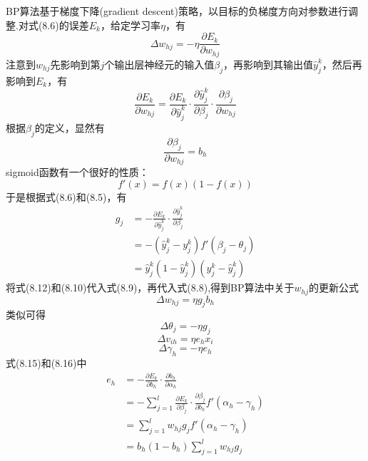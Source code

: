 \documentclass[openany]{progbookcn}
\begin{document}
\indent BP算法基于梯度下降(gradient descent)策略，以目标的负梯度方向对参数进行调整.对式(8.6)的误差$E_k$，给定学习率$\eta$，有
\begin{equation}
\Delta{w_{hj}}= - \eta \frac{{\partial {E_k}}}{{\partial {w_{hj}}}}
\end{equation}
\indent 注意到$w_{hj}$先影响到第$j$个输出层神经元的输入值$\beta_j$，再影响到其输出值${\hat y}_j^k$，然后再影响到$E_k$，有
\begin{equation}
\frac{{\partial {E_k}}}{{\partial {w_{hj}}}} = \frac{{\partial {E_k}}}{{\partial \hat y_j^k}} \cdot \frac{{\partial \hat y_j^k}}{{\partial {\beta _j}}} \cdot \frac{{\partial {\beta _j}}}{{\partial {w_{hj}}}}
\end{equation}
\indent 根据$\beta_j$的定义，显然有
\begin{equation}
\frac{{\partial {\beta _j}}}{{\partial {w_{hj}}}} = {b_h}
\end{equation}
\indent sigmoid函数有一个很好的性质：
\begin{equation}
f'(x)=f(x)(1-f(x))
\end{equation}
\indent 于是根据式(8.6)和(8.5)，有
\begin{equation}
\begin{aligned}
g_j& = - \frac{{\partial {E_k}}}{{\partial \hat y_j^k}} \cdot \frac{{\partial \hat y_j^k}}{{\partial {\beta _j}}}\\
&= - \left( {\hat y_j^k - y_j^k} \right)f'\left( {{\beta _j} - {\theta _j}} \right)\\
&=\hat y_j^k\left( {1 - \hat y_j^k} \right)\left( {y_j^k - \hat y_j^k} \right)
\end{aligned}
\end{equation}
\indent 将式(8.12)和(8.10)代入式(8.9)，再代入式(8.8),得到BP算法中关于$w_{hj}$的更新公式
\begin{equation}
    \Delta w_{hj}={\eta} {g_j} {b_h}
\end{equation}
\indent 类似可得
\begin{equation}
    \Delta\theta_j=-{\eta}g_j
\end{equation}
\begin{equation}
    \Delta v_{ih}={\eta}e_hx_i
\end{equation}
\begin{equation}
    \Delta \gamma_h=-{\eta}e_h
\end{equation}
\indent 式(8.15)和(8.16)中
\begin{equation}
\begin{aligned}
    e_h&= - \frac{{\partial {E_k}}}{{\partial {b_h}}} \cdot \frac{{\partial {b_h}}}{{\partial {\alpha _h}}}\\
       &= - \sum\limits_{j = 1}^l {\frac{{\partial {E_k}}}{{\partial {\beta _j}}} \cdot \frac{{\partial {\beta _j}}}{{\partial {b_h}}}f'\left( {{\alpha _h} - {\gamma _h}} \right)} \\
       &=\sum\limits_{j = 1}^l {{w_{hj}}{g_j}f'\left( {{\alpha _h} - {\gamma _h}} \right)} \\
       &={b_h}\left( {1 - {b_h}} \right)\sum\limits_{j = 1}^l {{w_{hj}}{g_j}} 
\end{aligned}
\end{equation}
\end{document}
